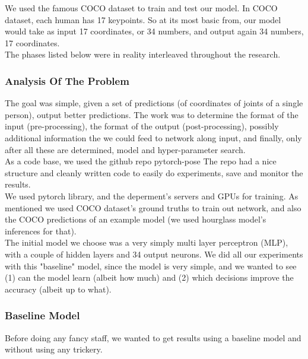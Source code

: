 \documentclass[titlepage, a4paper, 14pt]{extarticle} %
\begin{document}
We used the famous COCO dataset\cite{coco} to train and test our model. In COCO dataset, each human has 17 keypoints. So at its most basic from, our model would take as input 17 coordinates, or 34 numbers, and output again 34 numbers, 17 coordinates. \\

The phases listed below were in reality interleaved throughout the research.

\subsubsection{Analysis Of The Problem} \label{analysis}

The goal was simple, given a set of predictions (of coordinates of joints of a single person), output better predictions. The work was to determine the format of the input (pre-processing), the format of the output (post-processing), possibly additional information the we could feed to network along input, and finally, only after all these are determined, model and hyper-parameter search. \\

As a code base, we used the github repo pytorch-pose\cite{py-pose} The repo had a nice structure and cleanly written code to easily do experiments, save and monitor the results. \\

We used pytorch \cite{pytorch} library, and the deperment's servers and GPUs for training. As mentioned we used COCO dataset's ground truths to train out network, and also the COCO predictions of an example model (we used hourglass model's inferences for that)\cite{hourglass}. \\


The initial model we choose was a very simply multi layer perceptron (MLP), with a couple of hidden layers and 34 output neurons. We did all our experiments with this "baseline" model, since the model is very simple, and we wanted to see (1) can the model learn (albeit how much) and (2) which decisions improve the accuracy (albeit up to what).


\subsubsection{Baseline Model} \label{design}

Before doing any fancy staff, we wanted to get results using a baseline model and without using any trickery. \\
\end{document}
